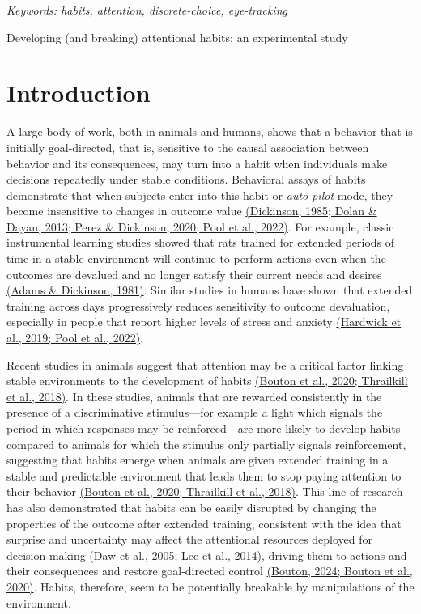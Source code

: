 \emph{Keywords: habits, attention, discrete-choice, eye-tracking}

Developing (and breaking) attentional habits: an experimental study

\section{Introduction}\label{introduction}

A large body of work, both in animals and humans, shows that a behavior that is initially goal-directed, that is, sensitive to the causal association between behavior and its consequences, may turn into a habit when individuals make decisions repeatedly under stable conditions. Behavioral assays of habits demonstrate that when subjects enter into this habit or \emph{auto-pilot} mode, they become insensitive to changes in outcome value \href{https://www.zotero.org/google-docs/?vZFOZ6}{(Dickinson, 1985; Dolan \& Dayan, 2013; Perez \& Dickinson, 2020; Pool et al., 2022)}. For example, classic instrumental learning studies showed that rats trained for extended periods of time in a stable environment will continue to perform actions even when the outcomes are devalued and no longer satisfy their current needs and desires \href{https://www.zotero.org/google-docs/?ycvERy}{(Adams \& Dickinson, 1981)}. Similar studies in humans have shown that extended training across days progressively reduces sensitivity to outcome devaluation, especially in people that report higher levels of stress and anxiety \href{https://www.zotero.org/google-docs/?PJYiYt}{(Hardwick et al., 2019; Pool et al., 2022)}.

Recent studies in animals suggest that attention may be a critical factor linking stable environments to the development of habits \href{https://www.zotero.org/google-docs/?b2gFIo}{(Bouton et al., 2020; Thrailkill et al., 2018)}. In these studies, animals that are rewarded consistently in the presence of a discriminative stimulus---for example a light which signals the period in which responses may be reinforced---are more likely to develop habits compared to animals for which the stimulus only partially signals reinforcement, suggesting that habits emerge when animals are given extended training in a stable and predictable environment that leads them to stop paying attention to their behavior \href{https://www.zotero.org/google-docs/?nMgBaG}{(Bouton et al., 2020; Thrailkill et al., 2018)}. This line of research has also demonstrated that habits can be easily disrupted by changing the properties of the outcome after extended training, consistent with the idea that surprise and uncertainty may affect the attentional resources deployed for decision making \href{https://www.zotero.org/google-docs/?svzmKl}{(Daw et al., 2005; Lee et al., 2014)}, driving them to actions and their consequences and restore goal-directed control \href{https://www.zotero.org/google-docs/?I0feaJ}{(Bouton, 2024; Bouton et al., 2020)}. Habits, therefore, seem to be potentially breakable by manipulations of the environment.

